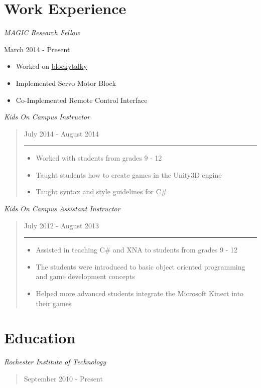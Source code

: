 \documentclass[line,margin]{res}
\begin{document}
\begin{resume}
\section{Work Experience}
{\sl MAGIC Research Fellow}
\begin{flushright}March 2014 - Present\end{flushright}
\begin{itemize}
\itemsep1pt\parskip0pt
\item
  Worked on
  \href{https://github.com/liam-middlebrook/blockytalky.git}{blockytalky}
\item
  Implemented Servo Motor Block
\item
  Co-Implemented Remote Control Interface
\end{itemize}
\sl{Kids On Campus
Instructor}
\begin{quote}
July 2014 - August 2014
\begin{center}\rule{3in}{0.4pt}\end{center}
\begin{itemize}
\itemsep1pt\parskip0pt
\item
  Worked with students from grades 9 - 12
\item
  Taught students how to create games in the Unity3D engine
\item
  Taught syntax and style guidelines for C\#
\end{itemize}
\end{quote}
\sl{Kids On Campus Assistant
Instructor}
\begin{quote}
July 2012 - August 2013
\begin{center}\rule{3in}{0.4pt}\end{center}
\begin{itemize}
\itemsep1pt\parskip0pt
\item
  Assisted in teaching C\# and XNA to students from grades 9 - 12
\item
  The students were introduced to basic object oriented programming and
  game development concepts
\item
  Helped more advanced students integrate the Microsoft Kinect into
  their games
\end{itemize}
\end{quote}
\section{Education}
\sl{Rochester Institute of
Technology}
\begin{quote}
September 2010 - Present

\end{quote}
\end{resume}
\end{document}

